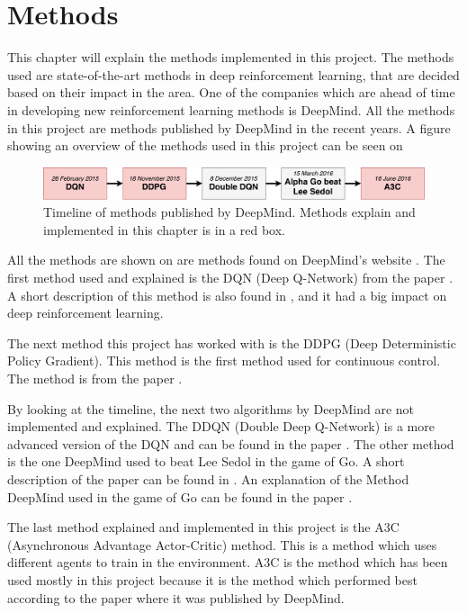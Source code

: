\chapter{Methods}
\label{chap:projectdef}
This chapter will explain the methods implemented in this project. The methods used are state-of-the-art methods in deep reinforcement learning, that are decided based on their impact in the area. One of the companies which are ahead of time in developing new reinforcement learning methods is DeepMind. All the methods in this project are methods published by DeepMind in the recent years. A figure showing an overview of the methods used in this project can be seen on           

\begin{figure}[H]
	\centering
	\includegraphics[width=1.25\textwidth]{Figures/Architecture/Methods_deepmind.pdf}
	\caption{Timeline of methods published by DeepMind. Methods explain and implemented in this chapter is in a red box.   }
	\label{fig:Methods_deepmind}
\end{figure}

All the methods are shown on  are methods found on DeepMind's website \cite{Publications_Deepmind}. The first method used and explained is the DQN (Deep Q-Network) from the paper \cite{DBLP:journals/corr/MnihKSGAWR13}. A short description of this method is also found in , and it had a big impact on deep reinforcement learning.

The next method this project has worked with is the DDPG (Deep Deterministic Policy Gradient). This method is the first method used for continuous control. The method is from the paper \cite{DBLP:journals/corr/LillicrapHPHETS15}. 

By looking at the timeline, the next two algorithms by DeepMind are not implemented and explained. The DDQN (Double Deep Q-Network) is a more advanced version of the DQN and can be found in the paper \cite{DBLP:journals/corr/HasseltGS15}. The other method is the one DeepMind used to beat Lee Sedol in the game of Go. A short description of the paper can be found in . An explanation of the Method DeepMind used in the game of Go can be found in the paper \cite{Silver_2016}. 

The last method explained and implemented in this project is the A3C (Asynchronous Advantage Actor-Critic) method. This is a method which uses different agents to train in the environment. A3C is the method which has been used mostly in this project because it is the method which performed best according to the paper \cite{DBLP:journals/corr/MnihBMGLHSK16} where it was published by DeepMind.

